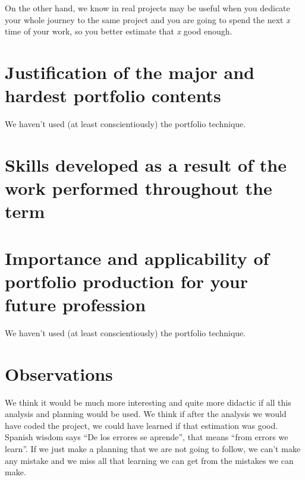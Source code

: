 \documentclass{report}
\begin{document}
On the other hand, we know in real projects may be useful when you dedicate your whole journey to the same project and you are going to spend the next \emph{x} time of your work, so you better estimate that \emph{x} good enough. 

\section{Justification of the major and hardest portfolio contents}
We haven't used (at least conscientiously) the portfolio technique.

\section{Skills developed as a result of the work performed throughout the term}


\section{Importance and applicability of portfolio production for your future profession}
We haven't used (at least conscientiously) the portfolio technique.

\section{Observations}
We think it would be much more interesting and quite more didactic if all this analysis and planning would be used. We think if after the analysis we would have coded the project, we could have learned if that estimation was good. Spanish wisdom says ``De los errores se aprende'', that means ``from errors we learn''. If we just make a planning that we are not going to follow, we can't make any mistake and we miss all that learning we can get from the mistakes we can make.
\end{document}
